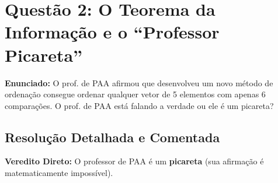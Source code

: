 \documentclass[11pt,a4paper]{article}
\begin{document}
\vspace{0.4cm}

\section*{Questão 2: O Teorema da Informação e o ``Professor Picareta''}

\textbf{Enunciado:} O prof. de PAA afirmou que desenvolveu um novo método de ordenação consegue ordenar qualquer vetor de 5 elementos com apenas 6 comparações. O prof. de PAA está falando a verdade ou ele é um picareta?

\subsection*{Resolução Detalhada e Comentada}

\textbf{Veredito Direto:} O professor de PAA é um \textbf{picareta} (sua afirmação é matematicamente impossível).
\end{document}
